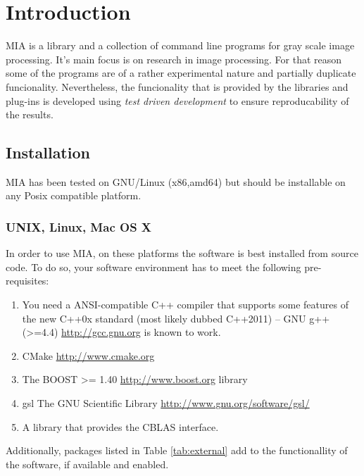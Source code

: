 \documentclass[english, 10pt, a4paper,headsepline,openany]{scrbook}
\begin{document}
\pagestyle{headings}


\chapter{Introduction}

MIA is a library and a collection of command line programs for gray scale image processing. 
It's main focus is on research in image processing.
For that reason some of the programs are of a rather experimental nature and partially 
   duplicate funcionality. 
Nevertheless, the funcionality that is provided by the libraries and plug-ins is developed 
  using \emph{test driven development} to ensure reproducability of the results.
 


\section{Installation}

MIA has been tested on GNU/Linux (x86,amd64) but should be installable on any Posix compatible platform. 


\subsection{UNIX, Linux, Mac OS X} 

In order to use MIA, on these platforms the software is best installed from source code. 
To do so, your software environment has to meet the following pre-requisites: 

\begin{enumerate}
\item You need a ANSI-compatible C++ compiler that supports some features of the new C++0x standard 
       (most likely dubbed C++2011) -- GNU g++ (>=4.4) \url{http://gcc.gnu.org} is known to work. 
\item CMake \url{http://www.cmake.org}
\item The BOOST >= 1.40 \url{http://www.boost.org} library
\item gsl The GNU Scientific Library \url{http://www.gnu.org/software/gsl/}
\item A library that provides the CBLAS interface.
\end{enumerate}

\noindent 
Additionally, packages listed in Table \ref{tab:external} add to the functionallity of the software, 
   if available and enabled.
\end{document}
